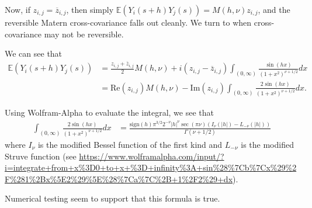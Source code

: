 \documentclass[11pt]{article}
\theoremstyle{plain}
\theoremstyle{definition}
\theoremstyle{condition}
\theoremstyle{remark}
\begin{document}
Now, if $z_{i,j} = \overline{z}_{i,j}$, then simply $\mathbb{E}(Y_i(s+h) Y_j(s))= M(h,\nu)z_{i,j}$, and the reversible Matern cross-covariance falls out cleanly. We turn to when cross-covariance may not be reversible.

We can see that 
\begin{align*}
\mathbb{E}(Y_i(s+h) Y_j(s))&= \frac{ z_{i,j} + \overline{z}_{i,j}}{2}M(h,\nu) + i%
(z_{i,j} - \overline{z}_{i,j}) \int_{(0,\infty)} \frac{\sin(hx)}{(1+x^2)^{\nu +1/2}}dx \\  %
&=\textrm{Re}(z_{i,j}) M(h,\nu) - \textrm{Im}(z_{i,j}) \int_{(0,\infty)} \frac{2\sin(hx)}{(1+x^2)^{\nu +1/2}}dx.  
\end{align*}

Using Wolfram-Alpha to evaluate the integral, we see that \begin{align*}
\int_{(0, \infty)} \frac{2\sin(hx)}{(1+x^2)^{\nu+1/2}} dx &= \frac{\textrm{sign}(h)\pi^{3/2} 2^{-\nu} |h|^{\nu} \sec(\pi\nu) ( I_\nu(|h|) - L_{-\nu}(|h|))}{\Gamma(\nu + 1/2)} 
\end{align*}where $I_\nu$ is the modified Bessel function of the first kind and $L_{-\nu}$ is the modified Struve function (see \url{https://www.wolframalpha.com/input/?i=integrate+from+x\%3D0+to+x+\%3D+infinity\%3A+sin\%28\%7Cb\%7Cx\%29\%2F\%281\%2Bx\%5E2\%29\%5E\%28\%7Ca\%7C\%2B+1\%2F2\%29+dx}).

Numerical testing seem to support that this formula is true.


    
    
    
   
   
\end{document}
